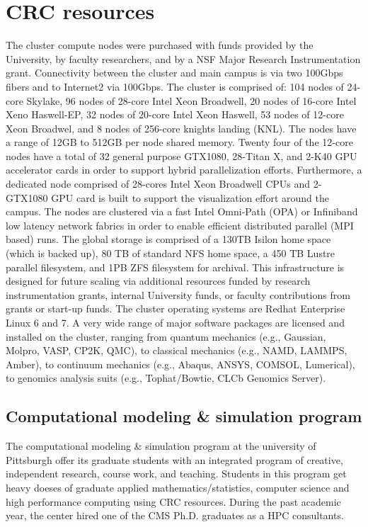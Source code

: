 \documentclass[conference]{IEEEtran}
\begin{document}
\section{CRC resources}
The cluster compute nodes were purchased with funds provided by the University, by faculty researchers, and by a NSF Major Research Instrumentation grant. Connectivity between the cluster and main campus is via two 100Gbps fibers and to Internet2 via 100Gbps.  The cluster is comprised of: 104 nodes of 24-core Skylake, 96 nodes of 28-core Intel Xeon Broadwell, 20 nodes of 16-core Intel Xeno Haswell-EP, 32 nodes of 20-core Intel Xeon Haswell, 53 nodes of 12-core Xeon Broadwel, and 8 nodes of 256-core knights landing (KNL). The nodes
have a range of 12GB to 512GB per node shared memory. Twenty four of the 12-core nodes have a total of 32 general
purpose GTX1080, 28-Titan X, and 2-K40 GPU accelerator cards in order to support hybrid parallelization efforts. Furthermore, a dedicated node comprised of 28-cores Intel Xeon Broadwell CPUs and 2-GTX1080 GPU card is built to support the visualization effort around the campus.
The nodes
are clustered via a fast Intel Omni-Path (OPA) or Infiniband low latency network fabrics in order to enable efficient distributed parallel
(MPI based) runs. The global storage is comprised of a 130TB Isilon home space (which is backed up), 80 TB of standard NFS home space, a 450 TB Lustre parallel filesystem, and 1PB ZFS filesystem for archival. This infrastructure is designed for future scaling via additional resources funded by research instrumentation grants, internal University funds, or faculty contributions from grants or start-up funds. The cluster operating systems are Redhat Enterprise Linux 6 and 7. A very wide range of major software packages are licensed and installed on the cluster, ranging from quantum mechanics (e.g., Gaussian, Molpro, VASP, CP2K, QMC), to classical mechanics (e.g., NAMD, LAMMPS, Amber), to continuum mechanics (e.g., Abaqus, ANSYS, COMSOL, Lumerical), to genomics analysis suits (e.g., Tophat/Bowtie, CLCb Genomics Server).

\subsection{Computational modeling \& simulation program}
The computational modeling \& simulation program at the university of Pittsburgh offer its graduate students with an integrated program of creative, independent research, course work, and teaching. Students in this program get heavy doeses of graduate applied mathematics/statistics, computer science and high performance computing using CRC resources. During the past academic year, the center hired one of the CMS Ph.D. graduates as a HPC consultants.  
\end{document}
